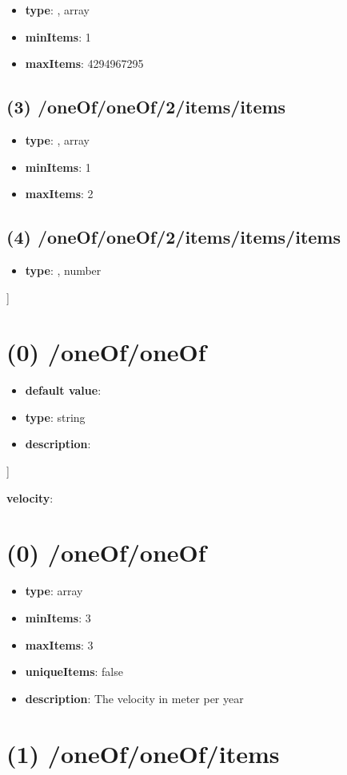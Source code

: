 \begin{itemize}[leftmargin=2em]\item {\bf type}: , array\item {\bf minItems}: 1
\item {\bf maxItems}: 4294967295
\end{itemize}\subsection{(3) /oneOf/oneOf/2/items/items}
\begin{itemize}[leftmargin=3em]\item {\bf type}: , array\item {\bf minItems}: 1
\item {\bf maxItems}: 2
\end{itemize}\subsection{(4) /oneOf/oneOf/2/items/items/items}
\begin{itemize}[leftmargin=4em]\item {\bf type}: , number\end{itemize}]\section{(0) /oneOf/oneOf}
\begin{itemize}[leftmargin=0em]\item {\bf default value}: 
\item {\bf type}: string
\item {\bf description}: 
\end{itemize}]\item {\bf velocity}: \section{(0) /oneOf/oneOf}
\begin{itemize}[leftmargin=0em]\item {\bf type}: array
\item {\bf minItems}: 3
\item {\bf maxItems}: 3
\item {\bf uniqueItems}: false
\item {\bf description}: The velocity in meter per year
\end{itemize}\section{(1) /oneOf/oneOf/items}
